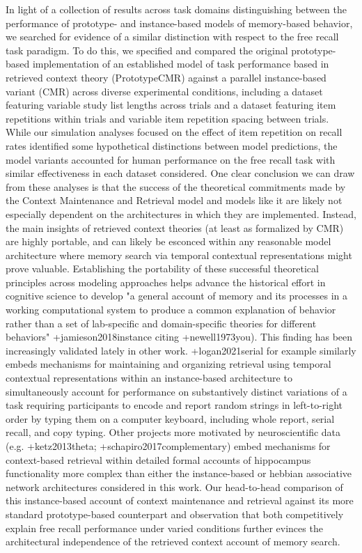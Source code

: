 In light of a collection of results across task domains distinguishing between the performance of prototype- and instance-based models of memory-based behavior, we searched for evidence of a similar distinction with respect to the free recall task paradigm. To do this, we specified and compared the original prototype-based implementation of an established model of task performance based in retrieved context theory (PrototypeCMR) against a parallel instance-based variant (CMR) across diverse experimental conditions, including a dataset featuring variable study list lengths across trials and a dataset featuring item repetitions within trials and variable item repetition spacing between trials. While our simulation analyses focused on the effect of item repetition on recall rates identified some hypothetical distinctions between model predictions, the model variants accounted for human performance on the free recall task with similar effectiveness in each dataset considered.\markdownRendererInterblockSeparator
{}One clear conclusion we can draw from these analyses is that the success of the theoretical commitments made by the Context Maintenance and Retrieval model and models like it are likely not especially dependent on the architectures in which they are implemented. Instead, the main insights of retrieved context theories (at least as formalized by CMR) are highly portable, and can likely be esconced within any reasonable model architecture where memory search via temporal contextual representations might prove valuable. Establishing the portability of these successful theoretical principles across modeling approaches helps advance the historical effort in cognitive science to develop "a general account of memory and its processes in a working computational system to produce a common explanation of behavior rather than a set of lab-specific and domain-specific theories for different behaviors" +{}{}{jamieson2018instance} citing +{}{}{newell1973you}).\markdownRendererInterblockSeparator
{}This finding has been increasingly validated lately in other work. +{}{}{logan2021serial} for example similarly embeds mechanisms for maintaining and organizing retrieval using temporal contextual representations within an instance-based architecture to simultaneously account for performance on substantively distinct variations of a task requiring participants to encode and report random strings in left-to-right order by typing them on a computer keyboard, including whole report, serial recall, and copy typing. Other projects more motivated by neuroscientific data (e.g. +{}{}{ketz2013theta}; +{}{}{schapiro2017complementary}) embed mechanisms for context-based retrieval within detailed formal accounts of hippocampus functionality more complex than either the instance-based or hebbian associative network architectures considered in this work. Our head-to-head comparison of this instance-based account of context maintenance and retrieval against its more standard prototype-based counterpart and observation that both competitively explain free recall performance under varied conditions further evinces the architectural independence of the retrieved context account of memory search.\markdownRendererInterblockSeparator
